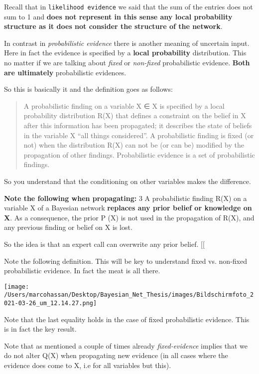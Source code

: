 \documentclass[a4paper]{article}
\begin{document}
Recall that in \texttt{likelihood evidence} we said that the sum of the
entries does not sum to 1 and \textbf{does not represent in this sense
any local probability structure as it does not consider the structure of the network}.

In contrast in \emph{probabilistic evidence} there is another meaning
of uncertain input. Here in fact the evidence is specified by a
\textbf{local probability} distribution. This no matter if we are talking
about \emph{fixed} or \emph{non-fixed} probabilistic evidence. \textbf{Both are
ultimately} probabilistic evidences.

So this is basically it and the definition goes as follows:

\begin{quote}
A probabilistic finding on a variable X ∈ X is specified by a local
probability distribution R(X) that defines a constraint on the belief
in X after this information has been propagated; it describes the
state of beliefs in the variable X “all things considered”. A
probabilistic finding is fixed (or not) when the distribution R(X) can
not be (or can be) modified by the propagation of other
findings. Probabilistic evidence is a set of probabilistic findings.
\end{quote}

So you understand that the conditioning on other variables makes
the difference.

\textbf{Note the following when propagating:} 3 A probabilistic finding
R(X) on a variable X of a Bayesian network \textbf{replaces any prior
belief or knowledge on X}. As a consequence, the prior P (X) is not
used in the propagation of R(X), and any previous finding or
belief on X is lost.

So the idea is that an expert call can overwrite any prior
belief. [[\label{question-where-does-the-probabilistic-finding-come-from}

Note the following definition. This will be key to understand
fixed vs. non-fixed probabilistic evidence. In fact the meat is
all there.

\begin{center}
\texttt{[image: /Users/marcohassan/Desktop/Bayesian\_Net\_Thesis/images/Bildschirmfoto\_2021-03-26\_um\_12.14.27.png]}
\end{center}


Note that the last equality holds in the case of fixed
probabilistic evidence. This is in fact the key result.

Note that as mentioned a couple of times already \emph{fixed-evidence}
implies that we do not alter Q(X) when propagating new evidence (in
all cases where the evidence does come to X, i.e for all variables
but this). 
\end{document}
